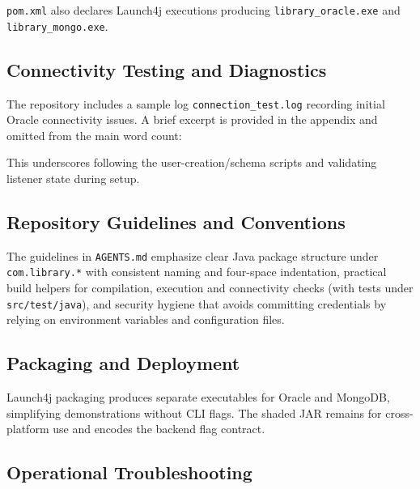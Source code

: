 \documentclass[12pt,a4paper]{article}
\newcommand{\code}[1]{\texttt{#1}}
\newcommand{\file}[1]{\texttt{#1}}
\begin{document}
\file{pom.xml} also declares Launch4j executions producing \code{library\_oracle.exe} and \code{library\_mongo.exe}.

\subsection{Connectivity Testing and Diagnostics}

The repository includes a sample log \file{connection\_test.log} recording initial Oracle connectivity issues. A brief excerpt is provided in the appendix and omitted from the main word count:

\begin{comment}
\begin{lstlisting}[style=java, caption=Oracle connectivity diagnostics]
ERROR:
ORA-01017: invalid username/password; logon denied

ERROR:
ORA-01005: null password given; logon denied
\end{lstlisting}
\end{comment}

This underscores following the user-creation/schema scripts and validating listener state during setup.

\subsection{Repository Guidelines and Conventions}

The guidelines in \file{AGENTS.md} emphasize clear Java package structure under \code{com.library.*} with consistent naming and four-space indentation, practical build helpers for compilation, execution and connectivity checks (with tests under \code{src/test/java}), and security hygiene that avoids committing credentials by relying on environment variables and configuration files.

\subsection{Packaging and Deployment}

Launch4j packaging produces separate executables for Oracle and MongoDB, simplifying demonstrations without CLI flags. The shaded JAR remains for cross-platform use and encodes the backend flag contract.

\subsection{Operational Troubleshooting}
\end{document}
